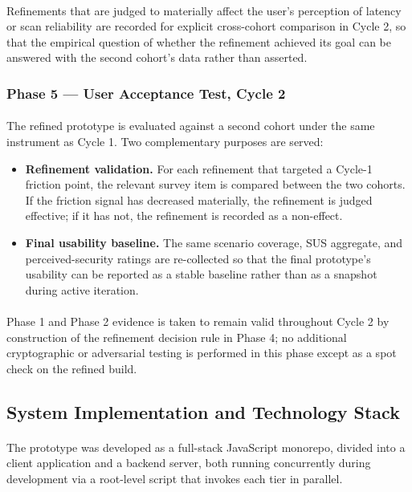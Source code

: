 \documentclass[a4paper]{scl-article}
\begin{document}
\paragraph{}Refinements that are judged to materially affect the user's perception of latency or scan reliability are recorded for explicit cross-cohort comparison in Cycle 2, so that the empirical question of whether the refinement achieved its goal can be answered with the second cohort's data rather than asserted.

\subsubsection{Phase 5 --- User Acceptance Test, Cycle 2}
\label{sect:meth4_uat2}
\paragraph{}The refined prototype is evaluated against a second cohort under the same instrument as Cycle 1. Two complementary purposes are served:
\begin{itemize}
    \item \textbf{Refinement validation.} For each refinement that targeted a Cycle-1 friction point, the relevant survey item is compared between the two cohorts. If the friction signal has decreased materially, the refinement is judged effective; if it has not, the refinement is recorded as a non-effect.
    \item \textbf{Final usability baseline.} The same scenario coverage, SUS aggregate, and perceived-security ratings are re-collected so that the final prototype's usability can be reported as a stable baseline rather than as a snapshot during active iteration.
\end{itemize}
\paragraph{}Phase 1 and Phase 2 evidence is taken to remain valid throughout Cycle 2 by construction of the refinement decision rule in Phase 4; no additional cryptographic or adversarial testing is performed in this phase except as a spot check on the refined build.




\subsection{System Implementation and Technology Stack}
\label{sect:meth4_d}
\paragraph{}The prototype was developed as a full-stack JavaScript monorepo, divided into a client application and a backend server, both running concurrently during development via a root-level script that invokes each tier in parallel.
\end{document}

